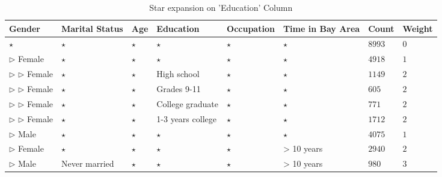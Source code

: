 \documentclass{sig-alternate}
\begin{document}
\begin{table} 
\centering 
\begin{tabular}{| p{1.5cm} | p{1.5cm} | p{1.5cm} | p{1.5cm} | p{1.5cm} | p{1.5cm} | l | l |} 
\hline Gender & Marital Status & Age & Education & Occupation & Time in Bay Area & Count & Weight \\ \hline 
\cline{1-8} $\star$ & $\star$ & $\star$ & $\star$ & $\star$ & $\star$ & $8993$ & $0$ \\
\cline{1-1} \cline{2-2} \cline{3-3} \cline{4-4} \cline{5-5} \cline{6-6} \cline{7-8} $\triangleright$ Female & $\star$ & $\star$ & $\star$ & $\star$ & $\star$ & $4918$ & $1$ \\
\cline{2-2} \cline{3-3} \cline{4-4} \cline{5-5} \cline{6-6} \cline{7-8} $\triangleright$ $\triangleright$ Female & $\star$ & $\star$ & High school & $\star$ & $\star$ & $1149$ & $2$ \\
\cline{2-2} \cline{3-3} \cline{4-4} \cline{5-5} \cline{6-6} \cline{7-8} $\triangleright$ $\triangleright$ Female & $\star$ & $\star$ & Grades 9-11 & $\star$ & $\star$ & $605$ & $2$ \\
\cline{2-2} \cline{3-3} \cline{4-4} \cline{5-5} \cline{6-6} \cline{7-8} $\triangleright$ $\triangleright$ Female & $\star$ & $\star$ & College graduate & $\star$ & $\star$ & $771$ & $2$ \\
\cline{2-2} \cline{3-3} \cline{4-4} \cline{5-5} \cline{6-6} \cline{7-8} $\triangleright$ $\triangleright$ Female & $\star$ & $\star$ & 1-3 years college & $\star$ & $\star$ & $1712$ & $2$ \\
\cline{1-1} \cline{2-2} \cline{3-3} \cline{4-4} \cline{5-5} \cline{6-6} \cline{7-8} $\triangleright$ Male & $\star$ & $\star$ & $\star$ & $\star$ & $\star$ & $4075$ & $1$ \\
\cline{1-1} \cline{2-2} \cline{3-3} \cline{4-4} \cline{5-5} \cline{6-6} \cline{7-8} $\triangleright$ Female & $\star$ & $\star$ & $\star$ & $\star$ & > 10 years & $2940$ & $2$ \\
\cline{1-1} \cline{2-2} \cline{3-3} \cline{4-4} \cline{5-5} \cline{6-6} \cline{7-8} $\triangleright$ Male & Never married & $\star$ & $\star$ & $\star$ & > 10 years & $980$ & $3$ \\
\hline 
\end{tabular} 
\caption{Star expansion on 'Education' Column \label{table:uiexamplestar}} 
\end{table} 
\end{document}
